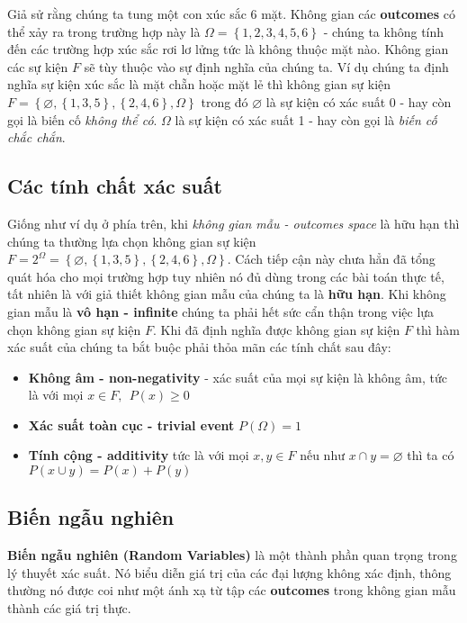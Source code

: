 \documentclass[../main-report.tex]{subfiles}
\begin{document}
Giả sử rằng chúng ta tung một con xúc sắc 6 mặt. Không gian các \textbf{outcomes} có thể xảy ra trong trường hợp này là $\Omega = \left \{ 1, 2, 3, 4, 5, 6 \right \}$ - chúng ta không tính đến các trường hợp xúc sắc rơi lơ lửng tức là không thuộc mặt nào. Không gian các sự kiện $F$ sẽ tùy thuộc vào sự định nghĩa của chúng ta. Ví dụ chúng ta định nghĩa sự kiện xúc sắc là mặt chẵn hoặc mặt lẻ thì không gian sự kiện $F=\left \{ \varnothing , \left \{ 1, 3, 5 \right \}, \left \{ 2, 4, 6 \right \}, \Omega \right \}$ trong đó $\varnothing$ là sự kiện có xác suất 0 - hay còn gọi là biến cố \textit{không thể có}. $\Omega$ là sự kiện có xác suất 1 - hay còn gọi là \textit{biến cố chắc chắn}.
\subsection{Các tính chất xác suất}
Giống như ví dụ ở phía trên, khi \textit{không gian mẫu - outcomes space} là hữu hạn thì chúng ta thường lựa chọn không gian sự kiện $F=2^{\Omega} = \left \{ \varnothing , \left \{ 1, 3, 5 \right \}, \left \{ 2, 4, 6 \right \}, \Omega \right \}$. Cách tiếp cận này chưa hẳn đã tổng quát hóa cho mọi trường hợp tuy nhiên nó đủ dùng trong các bài toán thực tế, tất nhiên là với giả thiết không gian mẫu của chúng ta là \textbf{hữu hạn}. Khi không gian mẫu là\textbf{ vô hạn - infinite} chúng ta phải hết sức cẩn thận trong việc lựa chọn không gian sự kiện $F$. Khi đã định nghĩa được không gian sự kiện $F$ thì hàm xác suất của chúng ta bắt buộc phải thỏa mãn các tính chất sau đây:

\begin{itemize}
\item \textbf{Không âm - non-negativity} - xác suất của mọi sự kiện là không âm, tức là với mọi $x \in F,~~ P(x)\geq 0$
\item \textbf{Xác suất toàn cục - trivial event} $P(\Omega) = 1$
\item \textbf{Tính cộng - additivity} tức là với mọi $x, y \in F$ nếu như $x\cap y= \varnothing$ thì ta có $P(x\cup y) = P(x) + P(y)$
\end{itemize}

\subsection{Biến ngẫu nghiên}
\textbf{Biến ngẫu nghiên (Random Variables)} là một thành phần quan trọng trong lý thuyết xác suất. Nó biểu diễn giá trị của các đại lượng không xác định, thông thường nó được coi như một ánh xạ từ tập các \textbf{outcomes} trong không gian mẫu thành các giá trị thực.
\end{document}
